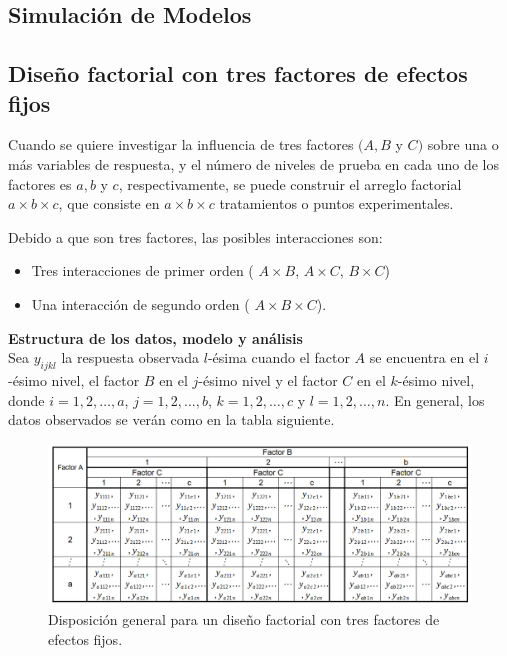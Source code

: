 \subsection{Simulación de Modelos}



\subsection{Diseño factorial con tres factores de efectos fijos}
Cuando se quiere investigar la influencia de tres factores $(A, B$ y $C)$ sobre una o más variables de respuesta, y el número de niveles de prueba en cada uno de los factores es $a, b$ y $c$, respectivamente, se puede construir el arreglo factorial $a \times b \times c$, que consiste en $a \times b \times c$ tratamientos o puntos experimentales.
\vspace{.5cm}

Debido a que son tres factores, las posibles interacciones son:
\begin{itemize}
	\item Tres interacciones de primer orden ( $A \times B $,  $A \times C $,  $B \times C $)
	\item Una interacción de segundo orden ( $A \times B \times C $).
\end{itemize}

\textbf{Estructura de los datos, modelo y análisis}\\
Sea $y_{ijkl}$ la respuesta observada $l$-ésima cuando el factor $A$ se encuentra en el $i$-ésimo nivel, el factor $B$ en el $j$-ésimo nivel y el factor $C$ en el $k$-ésimo nivel, donde  $i = 1,2, \dots, a$, $j = 1,2, \dots, b$, $k = 1,2, \dots, c$  y $l = 1,2, \dots, n$. En general, los datos observados se verán como en la tabla siguiente.


\begin{figure}[H] 
	\centering 
	\includegraphics[width=0.90\linewidth]{img/factorial.png} 
	\caption{Disposición general para un diseño factorial con tres factores de efectos fijos.} 
	\label{fig:FactorialTres}
\end{figure}
\FloatBarrier

